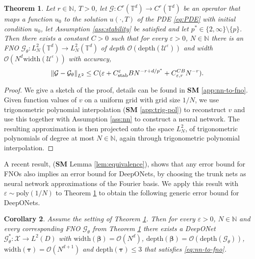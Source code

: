 \documentclass{article}
\numberwithin{equation}{section}
\newcommand{\poly}{\mathrm{poly}}
\newcommand{\width}{\mathrm{width}}
\newcommand{\depth}{\mathrm{depth}}
\newcommand{\T}{\mathbb{T}}
\newcommand{\N}{\mathbb{N}}
\newcommand{\cG}{\mathcal{G}}
\newcommand{\cU}{\mathcal{U}}
\newcommand{\cX}{\mathcal{X}}
\newcommand{\trunk}{{\bm{\tau}}}
\newcommand{\branch}{{\bm{\beta}}}
\renewcommand{\epsilon}{\varepsilon}
\newcommand{\1}{\mathbbm{1}}
\newcommand{\bigO}{\mathcal{O}}
\newtheorem{theorem}{Theorem}[section]
\newtheorem{corollary}[theorem]{Corollary}
\begin{document}
\begin{theorem}\label{thm:nn-to-fno}
Let $r\in\N$, $T>0$, let $\cG: C^r(\T^d)\to C^r(\T^d)$ be an operator that maps a function $u_0$ to the solution $u(\cdot, T)$ of the PDE \eqref{eq:PDE} with initial condition $u_0$, let Assumption \ref{ass:stability} be satisfied {\color{black}and let $p^*\in\{2,\infty\}\setminus\{p\}$}. Then there exists a constant $C>0$ such that for every $\epsilon>0$, $N\in\N$ there is an FNO $\cG_\theta: L^2_N(\T^d)\to L^2_N(\T^d)$ of depth $\bigO(\depth(\cU^\epsilon))$ and width $\bigO(N^d\width(\cU^\epsilon))$ with accuracy, 
\begin{equation}\label{eq:nn-to-fno}
    \norm{\cG-\cG_\theta}_{L^2}
\leq C(\epsilon + C^\epsilon_{\mathrm{stab}}BN^{-r+d/p^*}+ C_{\epsilon,r}^{CB}N^{-r}).
\end{equation}
\end{theorem}
\begin{proof}
We give a sketch of the proof, details can be found in \textbf{SM} \ref{app:nn-to-fno}. Given function values of $v$ on a uniform grid with grid size $1/N$, we use trigonometric polynomial interpolation (\textbf{SM} \ref{app:trig-pol}) to reconstruct $v$ and use this together with Assumption \ref{ass:nn} to construct a neural network. The resulting approximation is then projected onto {\color{black} the space $L^2_N$, of trigonometric polynomials of degree at most $N\in\N$}, again through trigonometric polynomial interpolation. 
\end{proof}

A recent result, \cite[Theorem 36]{kovachki2021universal} ({\bf SM} Lemma \ref{lem:equivalence}), shows that any error bound for FNOs also implies an error bound for DeepONets, by choosing the trunk nets as neural network approximations of the Fourier basis. We apply this result with $\epsilon\sim \poly(1/N)$ to Theorem \ref{thm:nn-to-fno} to obtain the following generic error bound for DeepONets. 

\begin{corollary}\label{cor:nn-to-deeponet}
Assume the setting of Theorem \ref{thm:nn-to-fno}. Then for every $\epsilon>0$, $N\in\N$ and every corresponding FNO $\cG_\theta$ from Theorem \ref{thm:nn-to-fno} there exists a DeepONet $\cG_\theta^*:\cX\to L^2(D)$ with $\width(\branch) = \bigO(N^d)$, $\depth(\branch) =\bigO(\depth(\cG_\theta))$, $\width(\trunk) =\bigO( N^{d+1})$ and $\depth(\trunk) \leq 3$ that satisfies \eqref{eq:nn-to-fno}. 
\end{corollary}
\end{document}
